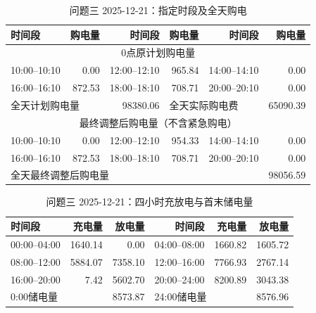 \FloatBarrier
\begin{table}[htbp]\centering\scriptsize
\caption{问题三 2025-12-21：指定时段及全天购电}
\begin{tabular}{lrrrrr}\toprule
时间段 & 购电量 & 时间段 & 购电量 & 时间段 & 购电量\\\midrule
\multicolumn{6}{c}{0点原计划购电量}\\
10:00--10:10 & 0.00 & 12:00--12:10 & 965.84 & 14:00--14:10 & 0.00\\
16:00--16:10 & 872.53 & 18:00--18:10 & 708.71 & 20:00--20:10 & 0.00\\
\multicolumn{2}{l}{全天计划购电量} & 98380.06 & \multicolumn{2}{l}{全天实际购电费} & 65090.39\\
\multicolumn{6}{c}{最终调整后购电量（不含紧急购电）}\\
10:00--10:10 & 0.00 & 12:00--12:10 & 954.33 & 14:00--14:10 & 0.00\\
16:00--16:10 & 872.53 & 18:00--18:10 & 708.71 & 20:00--20:10 & 0.00\\
\multicolumn{5}{l}{全天最终调整后购电量} & 98056.59\\
\bottomrule\end{tabular}\end{table}

\begin{table}[htbp]\centering\scriptsize
\caption{问题三 2025-12-21：四小时充放电与首末储电量}
\begin{tabular}{lrrrrr}\toprule
时间段 & 充电量 & 放电量 & 时间段 & 充电量 & 放电量\\\midrule
00:00--04:00 & 1640.14 & 0.00 & 04:00--08:00 & 1660.82 & 1605.72\\
08:00--12:00 & 5884.07 & 7358.10 & 12:00--16:00 & 7766.93 & 2767.14\\
16:00--20:00 & 7.42 & 5602.70 & 20:00--24:00 & 8200.89 & 3043.38\\
\multicolumn{2}{l}{0:00储电量} & 8573.87 & \multicolumn{2}{l}{24:00储电量} & 8576.96\\
\bottomrule\end{tabular}\end{table}

